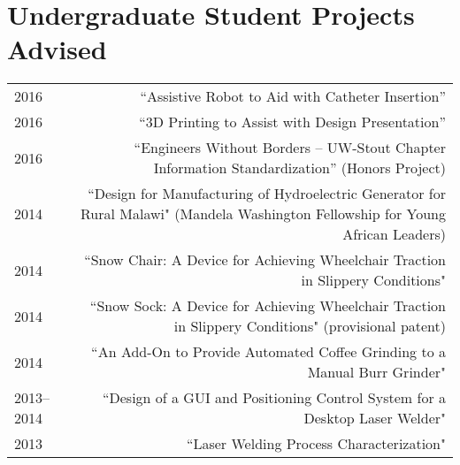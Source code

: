 
\section*{Undergraduate Student Projects Advised}
\begin{tabular}{L!{\VRule}R}
2016&``Assistive Robot to Aid with Catheter Insertion''\\
2016&``3D Printing to Assist with Design Presentation''\\
2016&``Engineers Without Borders – UW-Stout Chapter Information Standardization'' (Honors Project)\\
2014&``Design for Manufacturing of Hydroelectric Generator for Rural Malawi" (Mandela Washington Fellowship for Young African Leaders)\\
2014&``Snow Chair: A Device for Achieving Wheelchair Traction in Slippery Conditions"\\
2014&``Snow Sock: A Device for Achieving Wheelchair Traction in Slippery Conditions" (provisional patent)\\
2014&``An Add-On to Provide Automated Coffee Grinding to a Manual Burr Grinder"\\
2013--2014&``Design of a GUI and Positioning Control System for a Desktop Laser Welder"\\
2013&``Laser Welding Process Characterization"\\
\end{tabular}
